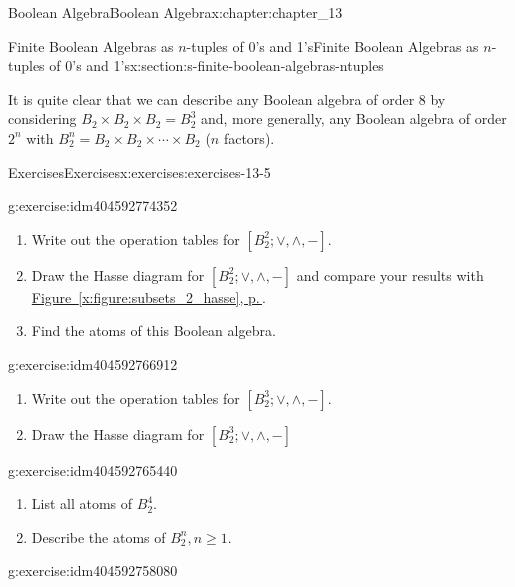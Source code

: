 \documentclass[twoside,10pt,]{book}
\newcommand{\xreffont}{\relax}
\numberwithin{equation}{section}
\begin{document}
\begin{chapterptx}{Boolean Algebra}{}{Boolean Algebra}{}{}{x:chapter:chapter_13}
\begin{sectionptx}{Finite Boolean Algebras as \(n\)-tuples of 0's and 1's}{}{Finite Boolean Algebras as \(n\)-tuples of 0's and 1's}{}{}{x:section:s-finite-boolean-algebras-ntuples}
\par
It is quite clear that we can describe any Boolean algebra of order 8 by considering \(B_2\times B_2\times B_2=B_2^3\) and, more generally, any Boolean algebra of order \(2^n\) with \(B_2^n=B_2\times B_2\times \cdots \times B_2\)  (\(n\) factors).%
%
%
\typeout{************************************************}
\typeout{************************************************}
%
\begin{exercises-subsection}{Exercises}{}{Exercises}{}{}{x:exercises:exercises-13-5}
\begin{divisionexercise}{1}{}{}{g:exercise:idm404592774352}%
%
\begin{enumerate}[label=(\alph*)]
\item{}Write out the operation tables for \(\left[B_2^2; \lor , \land, - \right].\)%
\item{}Draw the Hasse diagram for \(\left[B_2^2; \lor , \land, - \right]\) and compare your results with  \hyperref[x:figure:subsets_2_hasse]{Figure~{\xreffont\ref{x:figure:subsets_2_hasse}}, p.\,\pageref{x:figure:subsets_2_hasse}}.%
\item{}Find the atoms of this Boolean algebra.%
\end{enumerate}
%
\end{divisionexercise}%
\begin{divisionexercise}{2}{}{}{g:exercise:idm404592766912}%
%
\begin{enumerate}[label=(\alph*)]
\item{}Write out the operation tables for \(\left[B_2^3; \lor , \land, - \right].\)%
\item{}Draw the Hasse diagram for \(\left[B_2^3; \lor , \land , - \right]\)%
\end{enumerate}
%
\end{divisionexercise}%
\begin{divisionexercise}{3}{}{}{g:exercise:idm404592765440}%
%
\begin{enumerate}[label=(\alph*)]
\item{}List all atoms of \(B_2^4\).%
\item{}Describe the atoms of \(B_2^n, n \geq 1\).%
\end{enumerate}
%
\end{divisionexercise}%
\begin{divisionexercise}{4}{}{}{g:exercise:idm404592758080}%

\end{divisionexercise}
\end{exercises-subsection}
\end{sectionptx}
\end{chapterptx}
\end{document}
